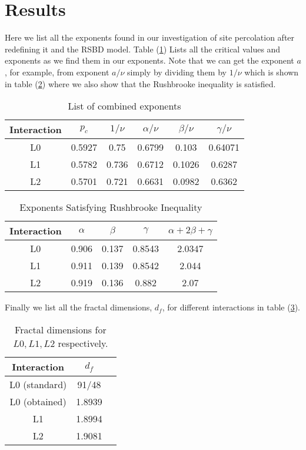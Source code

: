 \section{Results}
Here we list all the exponents found in our investigation of site percolation after redefining it and the RSBD model. Table (\ref{tab:exponents-combined}) Lists all the critical values and exponents as we find them in our exponents. Note that we can get the exponent $a$, for example, from exponent $a/\nu$ simply by dividing them by $1/\nu$ which is shown in table (\ref{tab:rushbrooke}) where we also show that the Rushbrooke inequality is satisfied.
\begin{table}[h]
\centering
\begin{tabular}{|c|c|c|c|c|c|}
	\hline
	Interaction & $p_c$ & $1/\nu$ & $\alpha/\nu$ & $\beta/\nu$ & $\gamma/\nu$ \\ \hline
	L0 & 0.5927 & 0.75  & 0.6799 & 0.103  & 0.64071  \\ \hline
	L1 & 0.5782 & 0.736 & 0.6712 & 0.1026 & 0.6287  \\ \hline
	L2 & 0.5701 & 0.721 & 0.6631 & 0.0982 & 0.6362  \\ \hline
\end{tabular}
\caption{List of combined exponents}
\label{tab:exponents-combined}
\end{table}

\begin{table}[h]
\centering
\begin{tabular}{|c|c|c|c|c|}
	\hline
	Interaction & $\alpha$ & $\beta$ & $\gamma$ & $\alpha+2\beta+\gamma$ \\ \hline
	L0  & 0.906 & 0.137 & 0.8543 & 2.0347   \\ \hline
	L1  & 0.911 & 0.139 & 0.8542 & 2.044   \\ \hline
	L2  & 0.919 & 0.136 & 0.882  & 2.07    \\ \hline
\end{tabular}
\caption{Exponents Satisfying Rushbrooke Inequality}
\label{tab:rushbrooke}
\end{table}

Finally we list all the fractal dimensions, $d_f$, for different interactions in table (\ref{tab:cluster-info}).
\begin{table}[h]
	\centering
	\begin{tabular}{|c|c|c|}
		\hline
		Interaction 	& $d_f$     \\ \hline
		L0 (standard) 	& 91/48     \\ \hline
		L0 (obtained)	& 1.8939   \\ \hline
		L1				& 1.8994      \\ \hline
		L2				& 1.9081     \\ \hline
	\end{tabular}
	\caption{Fractal dimensions for $L0,L1,L2$ respectively.}
	\label{tab:cluster-info}
\end{table}
		
